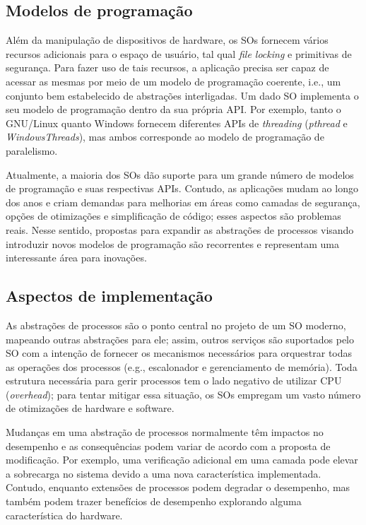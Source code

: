 \subsection{Modelos de programação}

Além da manipulação de dispositivos de hardware, os SOs fornecem vários
recursos adicionais para o espaço de usuário, tal qual \emph{file locking} e
primitivas de segurança. Para fazer uso de tais recursos, a aplicação precisa
ser capaz de acessar as mesmas por meio de um modelo de programação coerente,
i.e., um conjunto bem estabelecido de abstrações interligadas. Um dado SO
implementa o seu modelo de programação dentro da sua própria API. Por exemplo,
tanto o GNU/Linux quanto Windows fornecem diferentes APIs de \emph{threading}
(\emph{pthread} e \emph{WindowsThreads}), mas ambos corresponde ao modelo de
programação de paralelismo.

Atualmente, a maioria dos SOs dão suporte para um grande número de modelos de
programação e suas respectivas APIs. Contudo, as aplicações mudam ao longo dos
anos e criam demandas para melhorias em áreas como camadas de segurança, opções
de otimizações e simplificação de código; esses aspectos são problemas reais.
Nesse sentido, propostas para expandir as abstrações de processos visando
introduzir novos modelos de programação são recorrentes e representam uma
interessante área para inovações.

\subsection{Aspectos de implementação}

As abstrações de processos são o ponto central no projeto de um SO moderno,
mapeando outras abstrações para ele; assim, outros serviços são suportados pelo
SO com a intenção de fornecer os mecanismos necessários para orquestrar todas
as operações dos processos (e.g., escalonador e gerenciamento de memória). Toda
estrutura necessária para gerir processos tem o lado negativo de utilizar CPU
(\emph{overhead}); para tentar mitigar essa situação, os SOs empregam um vasto
número de otimizações de hardware e software.

Mudanças em uma abstração de processos normalmente têm impactos no desempenho e
as consequências podem variar de acordo com a proposta de modificação. Por
exemplo, uma verificação adicional em uma camada pode elevar a sobrecarga no
sistema devido a uma nova característica implementada. Contudo, enquanto
extensões de processos podem degradar o desempenho, mas também podem trazer
benefícios de desempenho explorando alguma característica do hardware.

